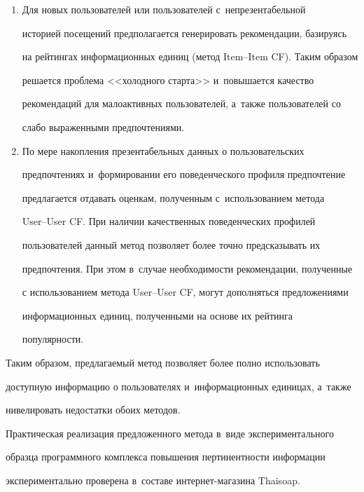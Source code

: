  \begin{enumerate}[1.]


\item Для новых пользователей или пользователей с~непрезентабельной 


историей посещений предполагается генерировать рекомендации, базируясь 


на рейтингах информационных единиц (метод Item--Item CF). Таким образом 


решается проблема <<холодного старта>> и~повышается качество 


рекомендаций для малоактивных пользователей, а~также пользователей со 


слабо выраженными предпочтениями. 


\item По мере накопления презентабельных данных о пользовательских 


предпочтениях и~формировании его поведенческого профиля предпочтение 


предлагается отдавать оценкам, полученным с~использованием метода  


User--User CF. При наличии качественных поведенческих профилей 


пользователей данный метод позволяет более точно предсказывать их 


предпочтения. При этом в~случае необходимости рекомендации, полученные 


с использованием метода User--User CF, могут дополняться предложениями 


информационных единиц, полученными на основе их рейтинга 


популярности. 


  \end{enumerate}


  


  Таким образом, предлагаемый метод позволяет более полно использовать 


доступную информацию о пользователях и~информационных единицах, а~также 


нивелировать недостатки обоих методов.


  


  Практическая реализация предложенного метода в~виде экспериментального 


образца программного комплекса повышения пертинентности информации 


экспериментально проверена в~составе ин\-тер\-нет-ма\-га\-зи\-на Thaisoap. 


